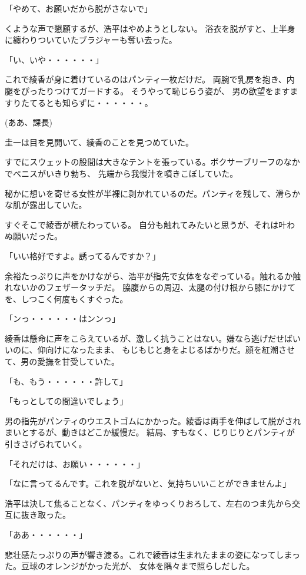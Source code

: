 ﻿\documentclass[book,tate]{jlreq}
\begin{document}
「やめて、お願いだから脱がさないで」

くような声で懇願するが、浩平はやめようとしない。 
浴衣を脱がすと、上半身に纏わりついていたブラジャーも奪い去った。

「い、いや・・・・・・」

これで綾香が身に着けているのはパンティ一枚だけだ。 両腕で乳房を抱き、内腿をぴったりつけてガードする。
そうやって恥じらう姿が、 男の欲望をますますりたてるとも知らずに・・・・・・。

(ああ、課長)

圭一は目を見開いて、綾香のことを見つめていた。

すでにスウェットの股間は大きなテントを張っている。ボクサーブリーフのなかでペニスがいきり勃ち、
先端から我慢汁を噴きこぼしていた。

秘かに想いを寄せる女性が半裸に剥かれているのだ。パンティを残して、滑らかな肌が露出していた。

すぐそこで綾香が横たわっている。 自分も触れてみたいと思うが、それは叶わぬ願いだった。

「いい格好ですよ。誘ってるんですか？」

余裕たっぷりに声をかけながら、浩平が指先で女体をなぞっている。触れるか触れないかのフェザータッチだ。
脇腹からの周辺、太腿の付け根から膝にかけてを、しつこく何度もくすぐった。

「ンっ・・・・・・はンンっ」

綾香は懸命に声をこらえているが、激しく抗うことはない。嫌なら逃げだせばいいのに、仰向けになったまま、
もじもじと身をよじるばかりだ。顔を紅潮させて、男の愛撫を甘受していた。

「も、もう・・・・・・許して」

「もっとしての間違いでしょう」

男の指先がパンティのウエストゴムにかかった。綾香は両手を伸ばして脱がされまいとするが、動きはどこか緩慢だ。
結局、すもなく、じりじりとパンティが引きさげられていく。

「それだけは、お願い・・・・・・」

「なに言ってるんです。これを脱がないと、気持ちいいことができませんよ」

浩平は決して焦ることなく、パンティをゆっくりおろして、左右のつま先から交互に抜き取った。

「ああ・・・・・・」

悲壮感たっぷりの声が響き渡る。これで綾香は生まれたままの姿になってしまった。豆球のオレンジがかった光が、
女体を隅々まで照らしだした。
\end{document}
